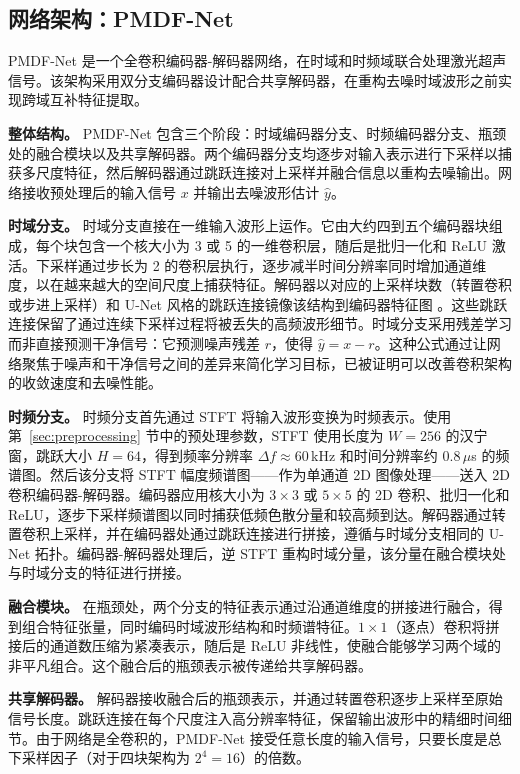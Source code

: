 \subsection{网络架构：PMDF-Net}
\label{sec:architecture}

PMDF-Net 是一个全卷积编码器-解码器网络，在时域和时频域联合处理激光超声信号。该架构采用双分支编码器设计配合共享解码器，在重构去噪时域波形之前实现跨域互补特征提取。

\textbf{整体结构。} PMDF-Net 包含三个阶段：时域编码器分支、时频编码器分支、瓶颈处的融合模块以及共享解码器。两个编码器分支均逐步对输入表示进行下采样以捕获多尺度特征，然后解码器通过跳跃连接对上采样并融合信息以重构去噪输出。网络接收预处理后的输入信号 $x$ 并输出去噪波形估计 $\hat{y}$。

\textbf{时域分支。} 时域分支直接在一维输入波形上运作。它由大约四到五个编码器块组成，每个块包含一个核大小为 3 或 5 的一维卷积层，随后是批归一化和 ReLU 激活。下采样通过步长为 2 的卷积层执行，逐步减半时间分辨率同时增加通道维度，以在越来越大的空间尺度上捕获特征。解码器以对应的上采样块数（转置卷积或步进上采样）和 U-Net 风格的跳跃连接镜像该结构到编码器特征图 \cite{ronneberger2015unet}。这些跳跃连接保留了通过连续下采样过程将被丢失的高频波形细节。时域分支采用残差学习 \cite{zhang2017denoising} 而非直接预测干净信号：它预测噪声残差 $r$，使得 $\hat{y} = x - r$。这种公式通过让网络聚焦于噪声和干净信号之间的差异来简化学习目标，已被证明可以改善卷积架构的收敛速度和去噪性能。

\textbf{时频分支。} 时频分支首先通过 STFT 将输入波形变换为时频表示。使用第~\ref{sec:preprocessing} 节中的预处理参数，STFT 使用长度为 $W = 256$ 的汉宁窗，跳跃大小 $H = 64$，得到频率分辨率 $\Delta f \approx 60$\,kHz 和时间分辨率约 $0.8$\,$\mu$s 的频谱图。然后该分支将 STFT 幅度频谱图——作为单通道 2D 图像处理——送入 2D 卷积编码器-解码器。编码器应用核大小为 $3 \times 3$ 或 $5 \times 5$ 的 2D 卷积、批归一化和 ReLU，逐步下采样频谱图以同时捕获低频色散分量和较高频到达。解码器通过转置卷积上采样，并在编码器处通过跳跃连接进行拼接，遵循与时域分支相同的 U-Net 拓扑。编码器-解码器处理后，逆 STFT 重构时域分量，该分量在融合模块处与时域分支的特征进行拼接。

\textbf{融合模块。} 在瓶颈处，两个分支的特征表示通过沿通道维度的拼接进行融合，得到组合特征张量，同时编码时域波形结构和时频谱特征。$1 \times 1$（逐点）卷积将拼接后的通道数压缩为紧凑表示，随后是 ReLU 非线性，使融合能够学习两个域的非平凡组合。这个融合后的瓶颈表示被传递给共享解码器。

\textbf{共享解码器。} 解码器接收融合后的瓶颈表示，并通过转置卷积逐步上采样至原始信号长度。跳跃连接在每个尺度注入高分辨率特征，保留输出波形中的精细时间细节。由于网络是全卷积的，PMDF-Net 接受任意长度的输入信号，只要长度是总下采样因子（对于四块架构为 $2^4 = 16$）的倍数。

